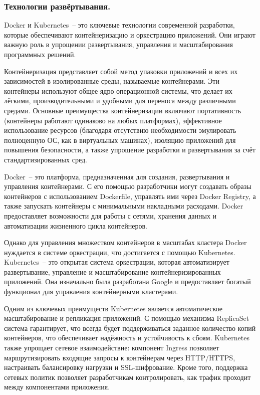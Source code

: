 \subsubsection{Технологии развёртывания. }

Docker и Kubernetes~-- это ключевые технологии современной разработки, которые обеспечивают контейнеризацию и оркестрацию приложений. Они играют важную роль в упрощении развертывания, управления и масштабирования программных решений.

Контейнеризация представляет собой метод упаковки приложений и всех их зависимостей в изолированные среды, называемые контейнерами. Эти контейнеры используют общее ядро операционной системы, что делает их лёгкими, производительными и удобными для переноса между различными средами. Основные преимущества контейнеризации включают портативность (контейнеры работают одинаково на любых платформах), эффективное использование ресурсов (благодаря отсутствию необходимости эмулировать полноценную ОС, как в виртуальных машинах), изоляцию приложений для повышения безопасности, а также упрощение разработки и развертывания за счёт стандартизированных сред.

Docker~-- это платформа, предназначенная для создания, развертывания и управления контейнерами. С его помощью разработчики могут создавать образы контейнеров с использованием Dockerfile, управлять ими через Docker Registry, а также запускать контейнеры с минимальными накладными расходами. Docker предоставляет возможности для работы с сетями, хранения данных и автоматизации жизненного цикла контейнеров.

Однако для управления множеством контейнеров в масштабах кластера Docker нуждается в системе оркестрации, что достигается с помощью Kubernetes. Kubernetes~-- это открытая система оркестрации, которая автоматизирует развертывание, управление и масштабирование контейнеризированных приложений. Она изначально была разработана Google и предоставляет богатый функционал для управления контейнерными кластерами.

Одним из ключевых преимуществ Kubernetes является автоматическое масштабирование и репликация приложений. С помощью механизма ReplicaSet система гарантирует, что всегда будет поддерживаться заданное количество копий контейнеров, что обеспечивает надёжность и устойчивость к сбоям. Kubernetes также упрощает сетевое взаимодействие: компонент Ingress позволяет маршрутизировать входящие запросы к контейнерам через HTTP/HTTPS, настраивать балансировку нагрузки и SSL-шифрование. Кроме того, поддержка сетевых политик позволяет разработчикам контролировать, как трафик проходит между компонентами приложения.

